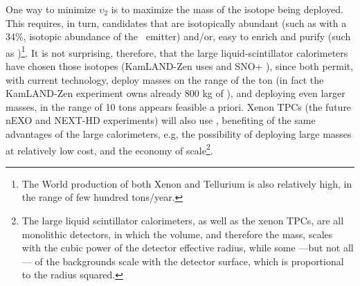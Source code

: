 One way to minimize $\upsilon_2$ is to maximize the mass of the isotope being deployed. This requires, in turn, candidates that are isotopically abundant (such as 
 with a 34\%, isotopic abundance of the \bb\ emitter) and/or, easy to enrich and purify (such as )\footnote{The World production of both Xenon and Tellurium is also relatively high, in the range of few hundred tons/year.}.
%
%
It is not surprising, therefore, that the large liquid-scintillator calorimeters have chosen those isotopes (KamLAND-Zen uses  and SNO+ ), since both permit, with current technology, deploy masses on the range of the ton (in fact  the KamLAND-Zen experiment owns already 800 kg of ), and deploying even larger masses, in the range of 10 tons appears feasible a priori. Xenon TPCs (the future nEXO and NEXT-HD experiments) will also use , benefiting of the same advantages of the large calorimeters, e.g, the possibility of deploying large masses at relatively low cost, and the economy of scale\footnote{The large liquid scintillator calorimeters, as well as the xenon TPCs, are all monolithic detectors, in which the volume, and therefore the mass, scales with the cubic power of the detector effective radius, while some ---but not all--- of the backgrounds scale with the detector surface, which is proportional to the radius squared.}. 



